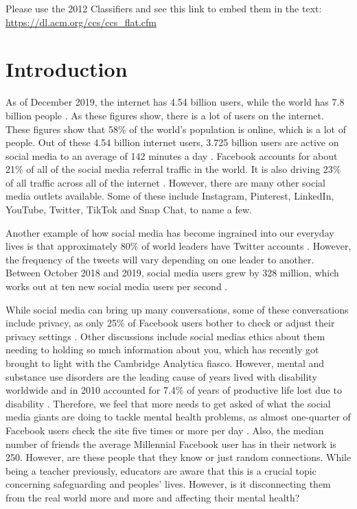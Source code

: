 \documentclass{sigchi}
\begin{document}
\printccsdesc
Please use the 2012 Classifiers and see this link to embed them in the text: \url{https://dl.acm.org/ccs/ccs_flat.cfm}



\section{Introduction}
	As of December 2019, the internet has 4.54 billion users, while the world has 7.8 billion people \cite{126_sm_facts}. As these figures show, there is a lot of users on the internet. These figures show that 58\% of the world's population is online, which is a lot of people. Out of these 4.54 billion internet users, 3.725 billion users are active on social media to an average of 142 minutes a day \cite{126_sm_facts}. Facebook accounts for about 21\% of all of the social media referral traffic in the world. It is also driving 23\% of all traffic across all of the internet \cite{47_sm_facts, 126_sm_facts}. However, there are many other social media outlets available. Some of these include Instagram, Pinterest, LinkedIn, YouTube, Twitter, TikTok and Snap Chat, to name a few.
	
	Another example of how social media has become ingrained into our everyday lives is that approximately 80\% of world leaders have Twitter accounts \cite{47_sm_facts}. However, the frequency of the tweets will vary depending on one leader to another. Between October 2018 and 2019, social media users grew by 328 million, which works out at ten new social media users per second \cite{126_sm_facts}.
	
	While social media can bring up many conversations, some of these conversations include privacy, as only 25\% of Facebook users bother to check or adjust their privacy settings \cite{47_sm_facts}. Other discussions include social medias ethics about them needing to holding so much information about you, which has recently got brought to light with the Cambridge Analytica fiasco. However, mental and substance use disorders are the leading cause of years lived with disability worldwide and in 2010 accounted for 7.4\% of years of productive life lost due to disability \cite{gkotsis2017characterisation}. Therefore, we feel that more needs to get asked of what the social media giants are doing to tackle mental health problems, as almost one-quarter of Facebook users check the site five times or more per day \cite{47_sm_facts}. Also, the median number of friends the average Millennial Facebook user has in their network is 250. However, are these people that they know or just random connections. While being a teacher previously, educators are aware that this is a crucial topic concerning safeguarding and peoples' lives. However, is it disconnecting them from the real world more and more and affecting their mental health?
	
\end{document}
